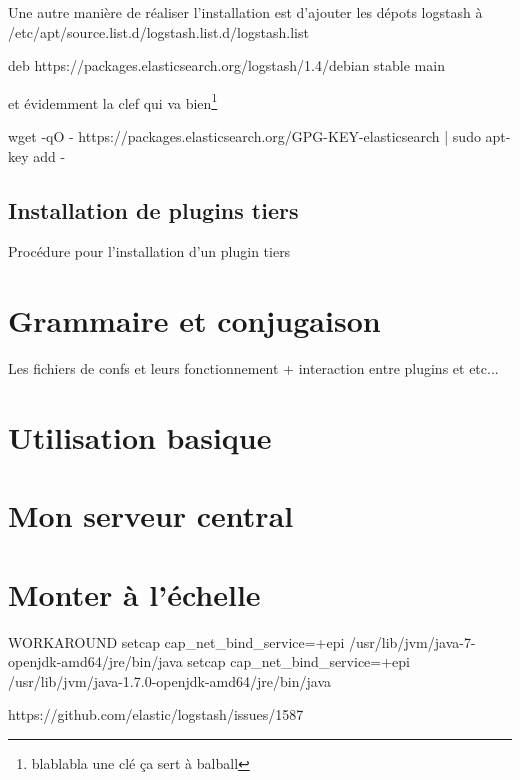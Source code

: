 Une autre manière de réaliser l'installation est d'ajouter les dépots logstash à 
/etc/apt/source.list.d/logstash.list.d/logstash.list

deb https://packages.elasticsearch.org/logstash/1.4/debian stable main

et évidemment la clef qui va bien\footnote{blablabla une clé ça sert à balball}

wget -qO - https://packages.elasticsearch.org/GPG-KEY-elasticsearch | sudo apt-key add -

\subsection{Installation de plugins tiers}
Procédure pour l'installation d'un plugin tiers


\section{Grammaire et conjugaison}

Les fichiers de confs et leurs fonctionnement + interaction entre plugins et etc...



\section{Utilisation basique}

\section{Mon serveur central}



\section{Monter à l'échelle}



WORKAROUND 
setcap cap\_net\_bind\_service=+epi /usr/lib/jvm/java-7-openjdk-amd64/jre/bin/java
setcap cap\_net\_bind\_service=+epi /usr/lib/jvm/java-1.7.0-openjdk-amd64/jre/bin/java


https://github.com/elastic/logstash/issues/1587
